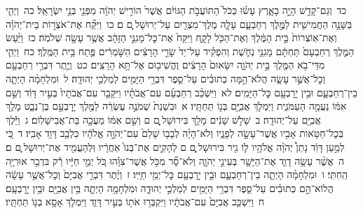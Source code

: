 \documentclass[18pt]{article}
\newcommand{\kri}[1]{\Afootnote{#1}}	%
\begin{document}
 {\loc כד~}וְגַם־קָדֵ֖שׁ הָיָ֣ה בָאָ֑רֶץ עָשׂ֗וּ כְּכֹל֙ הַתּוֹעֲבֹ֣ת הַגּוֹיִ֔ם אֲשֶׁר֙ הוֹרִ֣ישׁ יְהֹוָ֔ה מִפְּנֵ֖י בְּנֵ֥י יִשְׂרָאֵֽל׃ \startlock
 {\loc כה~}וַיְהִ֛י בַּשָּׁנָ֥ה הַחֲמִישִׁ֖ית לַמֶּ֣לֶךְ רְחַבְעָ֑ם עָלָ֛ה  \edtext{(שושק)}{\kri{קרי: שִׁישַׁ֥ק}}  מֶלֶךְ־מִצְרַ֖יִם עַל־יְרוּשָׁל ָֽ͏ְם ם׃ \startlock
 {\loc כו~}וַיִּקַּ֞ח אֶת־אֹצְר֣וֹת בֵּית־יְהֹוָ֗ה וְאֶת־אֽוֹצְרוֹת֙ בֵּ֣ית הַמֶּ֔לֶךְ וְאֶת־הַכֹּ֖ל לָקָ֑ח וַיִּקַּח֙ אֶת־כׇּל־מָגִנֵּ֣י הַזָּהָ֔ב אֲשֶׁ֥ר עָשָׂ֖ה שְׁלֹמֹֽה׃ \startlock
 {\loc כז~}וַיַּ֨עַשׂ הַמֶּ֤לֶךְ רְחַבְעָם֙ תַּחְתָּ֔ם מָגִנֵּ֖י נְחֹ֑שֶׁת וְהִפְקִ֗יד עַל־יַד֙ שָׂרֵ֣י הָרָצִ֔ים הַשֹּׁ֣מְרִ֔ים פֶּ֖תַח בֵּ֥ית הַמֶּֽלֶךְ׃ \startlock
 {\loc כח~}וַיְהִ֛י מִדֵּי־בֹ֥א הַמֶּ֖לֶךְ בֵּ֣ית יְהֹוָ֑ה יִשָּׂאוּם֙ הָרָצִ֔ים וֶהֱשִׁיב֖וּם אֶל־תָּ֥א הָרָצִֽים׃ \startlock
 {\loc כט~}וְיֶ֛תֶר דִּבְרֵ֥י רְחַבְעָ֖ם וְכׇל־אֲשֶׁ֣ר עָשָׂ֑ה הֲלֹא־הֵ֣מָּה כְתוּבִ֗ים עַל־סֵ֛פֶר דִּבְרֵ֥י הַיָּמִ֖ים לְמַלְכֵ֥י יְהוּדָֽה׃ \startlock
 {\loc ל~}וּמִלְחָמָ֨ה הָיְתָ֧ה בֵין־רְחַבְעָ֛ם וּבֵ֥ין יָרׇבְעָ֖ם כׇּל־הַיָּמִֽים׃ \startlock
 {\loc לא~}וַיִּשְׁכַּ֨ב רְחַבְעָ֜ם עִם־אֲבֹתָ֗יו וַיִּקָּבֵ֤ר עִם־אֲבֹתָיו֙ בְּעִ֣יר דָּוִ֔ד וְשֵׁ֣ם אִמּ֔וֹ נַעֲמָ֖ה הָעַמֹּנִ֑ית וַיִּמְלֹ֛ךְ אֲבִיָּ֥ם בְּנ֖וֹ תַּחְתָּֽיו׃ 
\startlock
 {\loc א~}וּבִשְׁנַת֙ שְׁמֹנֶ֣ה עֶשְׂרֵ֔ה לַמֶּ֖לֶךְ יָרׇבְעָ֣ם בֶּן־נְבָ֑ט מָלַ֥ךְ אֲבִיָּ֖ם עַל־יְהוּדָֽה׃ \startlock
 {\loc ב~}שָׁלֹ֣שׁ שָׁנִ֔ים מָלַ֖ךְ בִּירוּשָׁל ָ֑͏ְם ם וְשֵׁ֣ם אִמּ֔וֹ מַעֲכָ֖ה בַּת־אֲבִישָׁלֽוֹם׃ \startlock
 {\loc ג~}וַיֵּ֕לֶךְ בְּכׇל־חַטֹּ֥אות אָבִ֖יו אֲשֶׁר־עָשָׂ֣ה לְפָנָ֑יו וְלֹא־הָיָ֨ה לְבָב֤וֹ שָׁלֵם֙ עִם־יְהֹוָ֣ה אֱלֹהָ֔יו כִּלְבַ֖ב דָּוִ֥ד אָבִֽיו׃ \startlock
 {\loc ד~}כִּ֚י לְמַ֣עַן דָּוִ֔ד נָתַן֩ יְהֹוָ֨ה אֱלֹהָ֥יו ל֛וֹ נִ֖יר בִּירוּשָׁל ָ֑͏ְם ם לְהָקִ֤ים אֶת־בְּנוֹ֙ אַחֲרָ֔יו וּֽלְהַעֲמִ֖יד אֶת־יְרוּשָׁל ָֽ͏ְם ם׃ \startlock
 {\loc ה~}אֲשֶׁ֨ר עָשָׂ֥ה דָוִ֛ד אֶת־הַיָּשָׁ֖ר בְּעֵינֵ֣י יְהֹוָ֑ה וְלֹא־סָ֞ר מִכֹּ֣ל אֲשֶׁר־צִוָּ֗הוּ כֹּ֚ל יְמֵ֣י חַיָּ֔יו רַ֕ק בִּדְבַ֖ר אוּרִיָּ֥ה הַֽחִתִּֽי׃ \startlock
 {\loc ו~}וּמִלְחָמָ֨ה הָיְתָ֧ה בֵין־רְחַבְעָ֛ם וּבֵ֥ין יָרׇבְעָ֖ם כׇּל־יְמֵ֥י חַיָּֽיו׃ \startlock
 {\loc ז~}וְיֶ֨תֶר דִּבְרֵ֤י אֲבִיָּם֙ וְכׇל־אֲשֶׁ֣ר עָשָׂ֔ה הֲלוֹא־הֵ֣ם כְּתוּבִ֗ים עַל־סֵ֛פֶר דִּבְרֵ֥י הַיָּמִ֖ים לְמַלְכֵ֣י יְהוּדָ֑ה וּמִלְחָמָ֥ה הָיְתָ֛ה בֵּ֥ין אֲבִיָּ֖ם וּבֵ֥ין יָרׇבְעָֽם׃ \startlock
 {\loc ח~}וַיִּשְׁכַּ֤ב אֲבִיָּם֙ עִם־אֲבֹתָ֔יו וַיִּקְבְּר֥וּ אֹת֖וֹ בְּעִ֣יר דָּוִ֑ד וַיִּמְלֹ֛ךְ אָסָ֥א בְנ֖וֹ תַּחְתָּֽיו׃ \startlock
\end{document}
